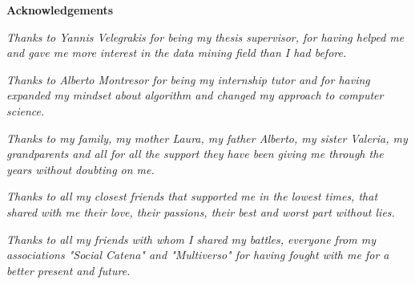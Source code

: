 \thispagestyle{empty}

\begin{center}
  {\bf \Huge Acknowledgements}
\end{center}

\vspace{4cm}


\emph{Thanks to Yannis Velegrakis for being my thesis supervisor, for having helped me and gave me more interest in the data mining field than I had before.}


\emph{Thanks to Alberto Montresor for being my internship tutor and for having expanded my mindset about algorithm and changed my approach to computer science.}


\emph{Thanks to my family, my mother Laura, my father Alberto, my sister Valeria, my grandparents and all for all the support they have been giving me through the years without doubting on me.}


\emph{Thanks to all my closest friends that supported me in the lowest times, that shared with me their love, their passions, their best and worst part without lies.}


\emph{Thanks to all my friends with whom I shared my battles, everyone from my associations "Social Catena" and "Multiverso" for having fought with me for a better present and future.
}
